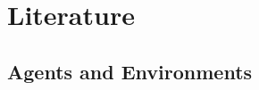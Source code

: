 \chapter{Literature} 
\label{chapter:Literature}





%




\section{Agents and Environments}
\label{sec:agents_and_environments}

